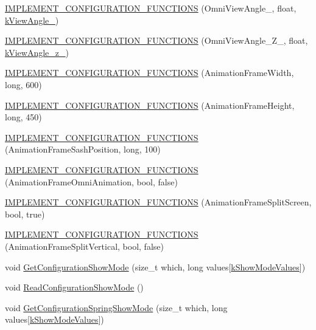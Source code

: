 \begin{DoxyCompactItemize}
\item 
\hyperlink{a00190_a9b11758e24a66cff1c3a70dec0b6b8fa}{I\-M\-P\-L\-E\-M\-E\-N\-T\-\_\-\-C\-O\-N\-F\-I\-G\-U\-R\-A\-T\-I\-O\-N\-\_\-\-F\-U\-N\-C\-T\-I\-O\-N\-S} (Omni\-View\-Angle\-\_, float, \hyperlink{a00186_a02f58587960368f53b105b6b56869d2e}{k\-View\-Angle\-\_})
\item 
\hyperlink{a00190_ab4e8df9485dd94fabc175aa91e1b5ae2}{I\-M\-P\-L\-E\-M\-E\-N\-T\-\_\-\-C\-O\-N\-F\-I\-G\-U\-R\-A\-T\-I\-O\-N\-\_\-\-F\-U\-N\-C\-T\-I\-O\-N\-S} (Omni\-View\-Angle\-\_\-\-Z\-\_, float, \hyperlink{a00186_a597fe6f0f926543fe64d51fc1969c7e3}{k\-View\-Angle\-\_\-z\-\_})
\item 
\hyperlink{a00190_ac3d6b32b1bb6006beca6ae0f4c2a6c45}{I\-M\-P\-L\-E\-M\-E\-N\-T\-\_\-\-C\-O\-N\-F\-I\-G\-U\-R\-A\-T\-I\-O\-N\-\_\-\-F\-U\-N\-C\-T\-I\-O\-N\-S} (Animation\-Frame\-Width, long, 600)
\item 
\hyperlink{a00190_a36e32fa17cd57542e6e08456e01b2f92}{I\-M\-P\-L\-E\-M\-E\-N\-T\-\_\-\-C\-O\-N\-F\-I\-G\-U\-R\-A\-T\-I\-O\-N\-\_\-\-F\-U\-N\-C\-T\-I\-O\-N\-S} (Animation\-Frame\-Height, long, 450)
\item 
\hyperlink{a00190_a109bf67bd8d8d881aff25c5ca4da6fd1}{I\-M\-P\-L\-E\-M\-E\-N\-T\-\_\-\-C\-O\-N\-F\-I\-G\-U\-R\-A\-T\-I\-O\-N\-\_\-\-F\-U\-N\-C\-T\-I\-O\-N\-S} (Animation\-Frame\-Sash\-Position, long, 100)
\item 
\hyperlink{a00190_ae1864e809735c1a36c898693795b4617}{I\-M\-P\-L\-E\-M\-E\-N\-T\-\_\-\-C\-O\-N\-F\-I\-G\-U\-R\-A\-T\-I\-O\-N\-\_\-\-F\-U\-N\-C\-T\-I\-O\-N\-S} (Animation\-Frame\-Omni\-Animation, bool, false)
\item 
\hyperlink{a00190_a85ada2d84d7cb05457e87768ea00239c}{I\-M\-P\-L\-E\-M\-E\-N\-T\-\_\-\-C\-O\-N\-F\-I\-G\-U\-R\-A\-T\-I\-O\-N\-\_\-\-F\-U\-N\-C\-T\-I\-O\-N\-S} (Animation\-Frame\-Split\-Screen, bool, true)
\item 
\hyperlink{a00190_ad5cb8762dfa83ab0bf5b62178a1661e6}{I\-M\-P\-L\-E\-M\-E\-N\-T\-\_\-\-C\-O\-N\-F\-I\-G\-U\-R\-A\-T\-I\-O\-N\-\_\-\-F\-U\-N\-C\-T\-I\-O\-N\-S} (Animation\-Frame\-Split\-Vertical, bool, false)
\item 
void \hyperlink{a00190_acfcfa727f9660f4d7eb0d3ee7d71e4f4}{Get\-Configuration\-Show\-Mode} (size\-\_\-t which, long values\mbox{[}\hyperlink{a00191_a9f04f33b4133efadaca3371489a3e3e0}{k\-Show\-Mode\-Values}\mbox{]})
\item 
void \hyperlink{a00190_a5bd9a6a48e09e3000c7c69ae847b160c}{Read\-Configuration\-Show\-Mode} ()
\item 
void \hyperlink{a00190_abaae587fba081a0c2272566b32ed5fa3}{Get\-Configuration\-Spring\-Show\-Mode} (size\-\_\-t which, long values\mbox{[}\hyperlink{a00191_a9f04f33b4133efadaca3371489a3e3e0}{k\-Show\-Mode\-Values}\mbox{]})

\end{DoxyCompactItemize}
